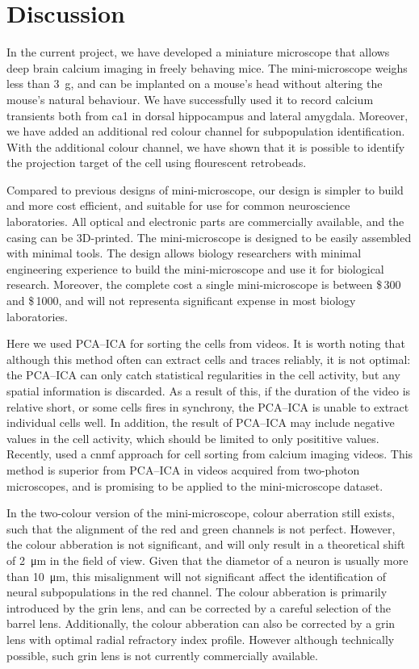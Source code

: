 \section{Discussion}

In the current project, we have developed a miniature microscope that allows deep brain calcium imaging in freely behaving mice. The mini-microscope weighs less than \SI{3}{\gram}, and can be implanted on a mouse's head without altering the mouse's natural behaviour. We have successfully used it to record calcium transients both from \gls{ca1} in dorsal hippocampus and lateral amygdala. Moreover, we have added an additional red colour channel for subpopulation identification. With the additional colour channel, we have shown that it is possible to identify the projection target of the cell using flourescent retrobeads. 

Compared to previous designs of mini-microscope, our design is simpler to build and more cost efficient, and suitable for use for common neuroscience laboratories. All optical and electronic parts are commercially available, and the casing can be 3D-printed. The mini-microscope is designed to be easily assembled with minimal tools. The design allows biology researchers with minimal engineering experience to build the mini-microscope and use it for biological research. Moreover, the complete cost a single mini-microscope is between \$\,300 and \$\,1000, and will not representa significant expense in most biology laboratories.

Here we used PCA--ICA for sorting the cells from videos. It is worth noting that although this method often can extract cells and traces reliably, it is not optimal: the PCA--ICA can only catch statistical regularities in the cell activity, but any spatial information is discarded. As a result of this, if the duration of the video is relative short, or some cells fires in synchrony, the PCA--ICA is unable to extract individual cells well. In addition, the result of PCA--ICA may include negative values in the cell activity, which should be limited to only posititive values. Recently, \citet{pnevmatikakis16} used a \gls{cnmf} approach for cell sorting from calcium imaging videos. This method is superior from PCA--ICA in videos acquired from two-photon microscopes, and is promising to be applied to the mini-microscope dataset. 

In the two-colour version of the mini-microscope, colour aberration still exists, such that the alignment of the red and green channels is not perfect. However, the colour abberation is not significant, and will only result in a theoretical shift of \SI{2}{\um} in the field of view. Given that the diametor of a neuron is usually more than \SI{10}{\um}, this misalignment will not significant affect the identification of neural subpopulations in the red channel. The colour abberation is primarily introduced by the \gls{grin} lens, and can be corrected by a careful selection of the barrel lens. Additionally, the colour abberation can also be corrected by a \gls{grin} lens with optimal radial refractory index profile. However although technically possible, such \gls{grin} lens is not currently commercially available. 





